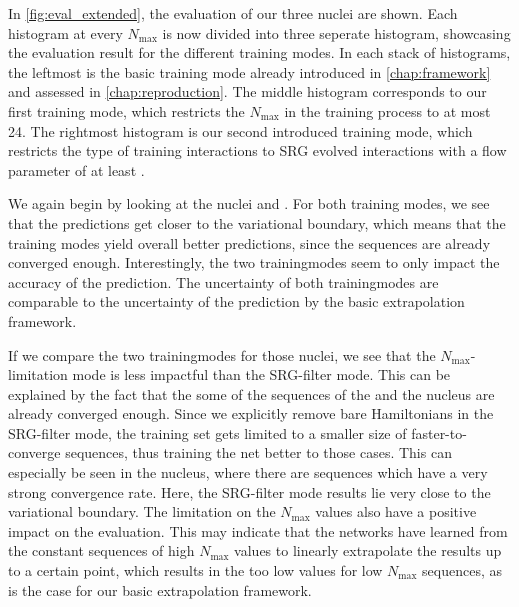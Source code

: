 In \autoref{fig:eval_extended}, the evaluation of our three nuclei are shown. Each histogram at every $N_\mathrm{max}$ is now divided into three seperate histogram, showcasing the evaluation result for the different training modes. In each stack of histograms, the leftmost is the basic training mode already introduced in \autoref{chap:framework} and assessed in \autoref{chap:reproduction}. The middle histogram corresponds to our first training mode, which restricts the $N_\mathrm{max}$ in the training process to at most 24. The rightmost histogram is our second introduced training mode, which restricts the type of training interactions to SRG evolved interactions with a flow parameter of at least .

We again begin by looking at the nuclei  and . For both training modes, we see that the predictions get closer to the variational boundary, which means that the training modes yield overall better predictions, since the sequences are already converged enough. Interestingly, the two trainingmodes seem to only impact the accuracy of the prediction. The uncertainty of both trainingmodes are comparable to the uncertainty of the prediction by the basic extrapolation framework.

If we compare the two trainingmodes for those nuclei, we see that the $N_\mathrm{max}$-limitation mode is less impactful than the SRG-filter mode. This can be explained by the fact that the some of the sequences of the  and the  nucleus are already converged enough. Since we explicitly remove bare Hamiltonians in the SRG-filter mode, the training set gets limited to a smaller size of faster-to-converge sequences, thus training the net better to those cases. This can especially be seen in the  nucleus, where there are sequences which have a very strong convergence rate. Here, the SRG-filter mode results lie very close to the variational boundary. The limitation on the $N_\mathrm{max}$ values also have a positive impact on the evaluation. This may indicate that the networks have learned from the constant sequences of high $N_\mathrm{max}$ values to linearly extrapolate the results up to a certain point, which results in the too low values for low $N_\mathrm{max}$ sequences, as is the case for our basic extrapolation framework.

